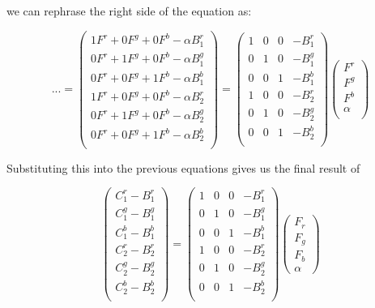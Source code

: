 \documentclass[11pt]{article}
\begin{document}
\begin{center}
we can rephrase the right side of the equation as:

$$
...
=
\begin{pmatrix}
  1 F^{r} + 0 F^{g} + 0 F^{b} - \alpha B^{r}_1\\
  0 F^{r} + 1 F^{g} + 0 F^{b} - \alpha B^{g}_1\\
  0 F^{r} + 0 F^{g} + 1 F^{b} - \alpha B^{b}_1\\
  1 F^{r} + 0 F^{g} + 0 F^{b} - \alpha B^{r}_2\\
  0 F^{r} + 1 F^{g} + 0 F^{b} - \alpha B^{g}_2\\
  0 F^{r} + 0 F^{g} + 1 F^{b} - \alpha B^{b}_2\\
\end{pmatrix}
=
\begin{pmatrix}
  1 & 0 & 0 & - B^{r}_1 \\
  0 & 1 & 0 & - B^{g}_1 \\
  0 & 0 & 1 & - B^{b}_1 \\
  1 & 0 & 0 & - B^{r}_2 \\
  0 & 1 & 0 & - B^{g}_2 \\
  0 & 0 & 1 & - B^{b}_2 \\
\end{pmatrix}
\begin{pmatrix}
	F^{r} \\
	F^{g} \\
	F^{b} \\
	\alpha \\
\end{pmatrix}
$$

Substituting this into the previous equations gives us the final result of

$$
\begin{pmatrix}
  C^{r}_1  -B^{r}_1 \\
  C^{g}_1 -B^{g}_1 \\
  C^{b}_1 -B^{b}_1 \\
  C^{r}_2 -B^{r}_2 \\
  C^{g}_2-B^{g}_2 \\
  C^{b}_2-B^{b}_2 \\
\end{pmatrix}=\begin{pmatrix}
1 & 	0 & 	0 & -B^{r}_1 \\
0 & 	1 & 	0 & -B^{g}_1 \\
0 & 	0 & 	1 & -B^{b}_1 \\
1 & 	0 & 	0 & -B^{r}_2 \\
0 & 	1 & 	0 & -B^{g}_2 \\
0 & 	0 & 	1 & -B^{b}_2 \\
\end{pmatrix} 
\begin{pmatrix}
F_r \\
F_g \\
F_b \\
\alpha
\end{pmatrix}
$$
\end{center}
\end{document}

